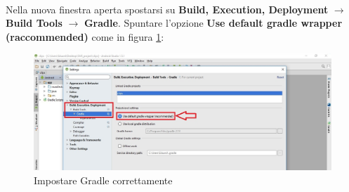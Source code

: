 \documentclass[../ManualeSviluppatore.tex]{subfiles}
\begin{document}
		\paragraph*{}
			Nella nuova finestra aperta spostarsi su \textbf{Build, Execution, Deployment} $\rightarrow$ \textbf{Build Tools} $\rightarrow$ \textbf{Gradle}. Spuntare l'opzione \textbf{Use default gradle wrapper (raccommended)} come in figura \ref{fig:SetGradle}:
			
			\begin{figure} [h]
				\centering
				\includegraphics[width=\textwidth]{img/SetGradle}
				\caption{Impostare Gradle correttamente}
				\label{fig:SetGradle}
			\end{figure}
		
\end{document}
